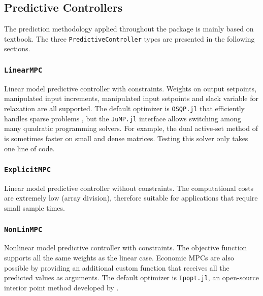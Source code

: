 \subsection{Predictive Controllers}

The prediction methodology applied throughout the package is mainly based on \citet{mpcMac} textbook. The three \texttt{PredictiveController} types are presented in the following sections.

\subsubsection{\textnormal{\texttt{LinearMPC}}}
Linear model predictive controller with constraints. Weights on output setpoints, manipulated input increments, manipulated input setpoints and slack variable for relaxation are all supported. The default optimizer is \texttt{OSQP.jl} that efficiently handles sparse problems \citep{osqp}, but the \texttt{JuMP.jl} interface allows switching among many quadratic programming solvers. For example, the dual active-set method of \citet{daqp} is sometimes faster on small and dense matrices. Testing this solver only takes one line of code.

\subsubsection{\textnormal{\texttt{ExplicitMPC}}}
Linear model predictive controller without constraints. The computational costs are extremely low (array division), therefore suitable for applications that require small sample times.

\subsubsection{\textnormal{\texttt{NonLinMPC}}}
Nonlinear model predictive controller with constraints. The objective function supports all the same weights as the linear case. Economic MPCs are also possible by providing an additional custom function that receives all the predicted values as arguments. The default optimizer is \texttt{Ipopt.jl}, an open-source interior point method developed by \citet{ipopt}.



